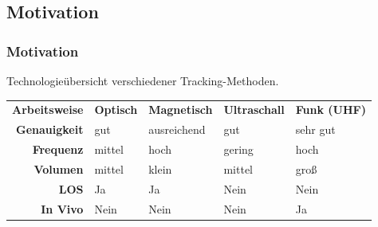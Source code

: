 \subsection{Motivation}
\begin{frame} %
  	\frametitle{Motivation}
  	\begin{center}
  	\small Technologieübersicht verschiedener Tracking-Methoden.
  	\end{center}
%
	\begin{table} [H]
		\begin{center}
			\begin{tabular}{rllll}
				\textbf{Arbeitsweise} & \textbf{Optisch} & \textbf{Magnetisch} & \textbf{Ultraschall} & \textbf{ Funk (UHF)} \\
				\textbf{Genauigkeit} & gut & ausreichend & gut & sehr gut \\
				\textbf{Frequenz} & mittel & hoch & gering & hoch \\
				\textbf{Volumen} & mittel & klein & mittel & groß \\
				\textbf{LOS} & Ja & Ja & Nein & Nein \\
				\textbf{In Vivo} & Nein   & Nein & Nein & Ja \\
%			
			\end{tabular}
		\end{center}
		\label{tab:overview_tracking}
	\end{table}  	
\end{frame}
